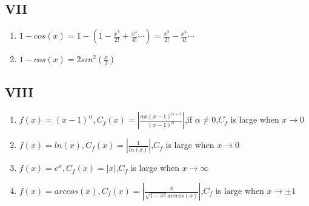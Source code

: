 \documentclass[12]{article}%
\begin{document}
        \subsection{VII}
            \begin{enumerate}
                \item $1-cos(x)=1-(1-\frac{x^2}{2!}+\frac{x^4}{4!}\cdots)=\frac{x^2}{2!}-\frac{x^4}{4!}\cdots$
                \item $1-cos(x)=2sin^2(\frac{x}{2})$
            \end{enumerate}

        \subsection{VIII}
            \begin{enumerate}
                \item $f(x)=(x-1)^\alpha,C_f(x)=|\frac{\alpha x(x-1)^{\alpha-1}}{(x-1)^\alpha}|$,if $\alpha\neq0$,$C_f$ is large when $ x\rightarrow 0$
                \item $f(x)=ln(x),C_f(x)=|\frac{1}{ln(x)}|$,$C_f$ is large when $ x\rightarrow 0$
                \item $f(x)=e^x,C_f(x)=|x|$,$C_f$ is large when $ x\rightarrow \infty$
                \item $f(x)=arccos(x),C_f(x)=|\frac{x}{\sqrt{1-x^2}arccos(x)}|$,$C_f$ is large when $ x\rightarrow \pm 1$
           
            \end{enumerate}
\end{document}
